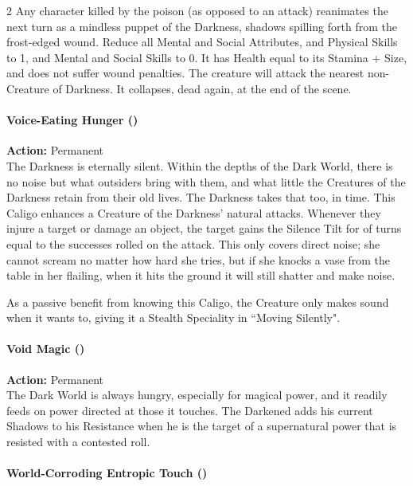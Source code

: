 \begin{multicols}{2}
Any character killed by the poison (as opposed to an attack) reanimates the next turn as a mindless puppet of the Darkness, shadows spilling forth from the frost-edged wound. Reduce all Mental and Social Attributes, and Physical Skills to 1, and Mental and Social Skills to 0. It has Health equal to its Stamina + Size, and does not suffer wound penalties. The creature will attack the nearest non-Creature of Darkness. It collapses, dead again, at the end of the scene.

\paragraph*{Voice-Eating Hunger (\textbullet)}

\noindent \textbf{Action:} Permanent\\

\noindent The Darkness is eternally silent. Within the depths of the Dark World, there is no noise but what outsiders bring with them, and what little the Creatures of the Darkness retain from their old lives. The Darkness takes that too, in time. This Caligo enhances a Creature of the Darkness' natural attacks. Whenever they injure a target or damage an object, the target gains the Silence Tilt for of turns equal to the successes rolled on the attack. This only covers direct noise; she cannot scream no matter how hard she tries, but if she knocks a vase from the table in her flailing, when it hits the ground it will still shatter and make noise.

As a passive benefit from knowing this Caligo, the Creature only makes sound when it wants to, giving it a Stealth Speciality in \textquotedblleft Moving Silently".

\paragraph*{Void Magic (\textbullet)} 

\noindent \textbf{Action:} Permanent \\

\noindent The Dark World is always hungry, especially for magical power, and it readily feeds on power directed at those it touches. The Darkened adds his current Shadows to his Resistance when he is the target of a supernatural power that is resisted with a contested roll.\\

\paragraph*{World-Corroding Entropic Touch (\textbullet\textbullet\textbullet)}


\end{multicols}
